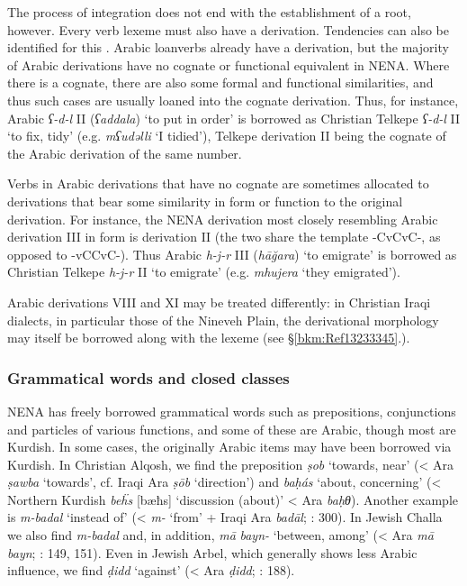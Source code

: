 \documentclass[output=paper]{langsci/langscibook}
\begin{document}
The process of integration does not end with the establishment of a root, however. Every verb lexeme must also have a derivation. Tendencies can also be identified for this \citep{Coghill2015}. Arabic loanverbs already have a derivation, but the majority of Arabic derivations have no cognate or functional equivalent in NENA. Where there is a cognate, there are also some formal and functional similarities, and thus such cases are usually loaned into the cognate derivation. Thus, for instance, Arabic \textit{ʕ-d-l} II (\textit{ʕaddala}) ‘to put in order’ is borrowed as Christian Telkepe \textit{ʕ-d-l} II ‘to fix, tidy’ (e.g. \textit{mʕudəlli} ‘I tidied’), Telkepe derivation II being the cognate of the Arabic derivation of the same number.

Verbs in Arabic derivations that have no cognate are sometimes allocated to derivations that bear some similarity in form or function to the original derivation. For instance, the NENA derivation most closely resembling Arabic derivation III in form is derivation II (the two share the template -CvCvC-, as opposed to -vCCvC-). Thus Arabic \textit{h-j-r} III (\textit{hāğara}) ‘to emigrate’ is borrowed as Christian Telkepe \textit{h-j-r} II ‘to emigrate’ (e.g. \textit{mhujera} ‘they emigrated’).

Arabic derivations VIII and XI may be treated differently: in Christian Iraqi dialects, in particular those of the Nineveh Plain, the derivational morphology may itself be borrowed along with the lexeme (see §\ref{bkm:Ref13233345}.).

\subsubsection{Grammatical words and closed classes}

NENA has freely borrowed grammatical words such as prepositions, conjunctions and particles of various functions, and some of these are Arabic, though most are Kurdish. In some cases, the originally Arabic items may have been borrowed via Kurdish. In Christian Alqosh, we find the preposition \textit{ṣob} ‘towards, near’ (< Ara \textit{ṣawba} ‘towards’, cf. Iraqi Ara \textit{ṣōb} ‘direction’) and \textit{baḥás} ‘about, concerning’ (< Northern Kurdish \textit{be\"{h}s} [bæħs] ‘discussion (about)’ < Ara \textit{baḥθ}). Another example is \textit{m-badal} ‘instead of’ (< \textit{m-} ‘from’ + Iraqi Ara \textit{badāl}; \citealt{Coghill2004}: 300). In Jewish Challa we also find \textit{m-badal} and, in addition, \textit{mā} \textit{bayn-} ‘between, among’ (< Ara \textit{mā} \textit{bayn}; \citealt{Fassberg2010}: 149, 151). Even in Jewish Arbel, which generally shows less Arabic influence, we find \textit{ḍidd} ‘against’ (< Ara \textit{ḍidd}; \citealt{Khan1999}: 188).
\end{document}
